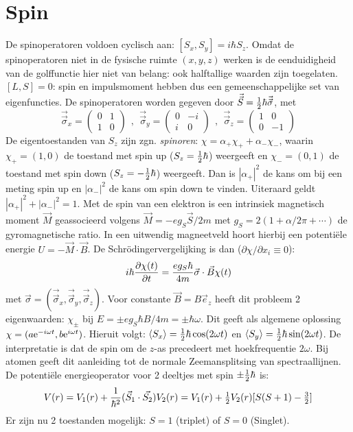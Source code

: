 \section[~~Spin]{Spin}
De spinoperatoren voldoen cyclisch aan: $[S_x,S_y]=i\hbar S_z$. Omdat de
spinoperatoren niet in de fysische ruimte $(x,y,z)$ werken is de
eenduidigheid van de golffunctie hier niet van belang: ook halftallige
waarden zijn toegelaten. $[L,S]=0$: spin en impulsmoment hebben dus een
gemeenschappelijke set van eigenfuncties. De spinoperatoren worden gegeven
door $\vec{\vec{S}}=\mbox{$\frac{1}{2}$}\hbar\vec{\vec{\sigma}}$, met
\[
\vec{\vec{\sigma}}_x=\left(\begin{array}{cc}0&1\\1&0\end{array}\right)~~,~~
\vec{\vec{\sigma}}_y=\left(\begin{array}{cc}0&-i\\i&0\end{array}\right)~~,~~
\vec{\vec{\sigma}}_z=\left(\begin{array}{cc}1&0\\0&-1\end{array}\right)
\]
De eigentoestanden van $S_z$ zijn zgn. {\it spinoren}:
$\chi=\alpha_+\chi_++\alpha_-\chi_-$, waarin $\chi_+=(1,0)$ de toestand met
spin up ($S_z=\mbox{$\frac{1}{2}$}\hbar$) weergeeft en $\chi_-=(0,1)$ de toestand met spin
down ($S_z=-\mbox{$\frac{1}{2}$}\hbar$) weergeeft. Dan is $|\alpha_+|^2$ de kans om bij een
meting spin up en $|\alpha_-|^2$ de kans om spin down te vinden. Uiteraard
geldt $|\alpha_+|^2+|\alpha_-|^2=1$.
\npar
Met de spin van een elektron is een intrinsiek magnetisch moment $\vec{M}$
geassocieerd volgens $\vec{M}=-eg_S\vec{S}/2m$ met $g_S=2(1+\alpha/2\pi+\cdots)$
de gyromagnetische ratio. In een uitwendig magneetveld hoort hierbij een
potenti\"ele energie $U=-\vec{M}\cdot\vec{B}$. De Schr\"odingervergelijking
is dan ($\partial\chi/\partial x_i\equiv0$):
\[
i\hbar\frac{\partial \chi(t)}{\partial t}=\frac{eg_S\hbar}{4m}\vec{\sigma}\cdot\vec{B}\chi(t)
\]
met $\vec{\sigma}=(\vec{\vec{\sigma}}_x,\vec{\vec{\sigma}}_y,\vec{\vec{\sigma}}_z)$.
Voor constante $\vec{B}=B\vec{e}_z$ heeft dit probleem 2 eigenwaarden:
$\chi_\pm$ bij $E=\pm eg_S\hbar B/4m=\pm\hbar\omega$. Dit geeft als algemene
oplossing $\chi=(a{\rm e}^{-i\omega t},b{\rm e}^{i\omega t})$. Hieruit volgt:
$\left\langle S_x \right\rangle=\mbox{$\frac{1}{2}$}\hbar\cos(2\omega t)$ en $\left\langle S_y \right\rangle=\mbox{$\frac{1}{2}$}\hbar\sin(2\omega t)$.
De interpretatie is dat de spin om de $z$-as precedeert met hoekfrequentie
$2\omega$. Bij atomen geeft dit aanleiding tot de normale Zeemansplitsing van
spectraallijnen.
\npar
De potenti\"ele energieoperator voor 2 deeltjes met spin $\pm\mbox{$\frac{1}{2}$}\hbar$ is:
\[
V(r)=V_1(r)+\frac{1}{\hbar^2}(\vec{S}_1\cdot\vec{S_2})V_2(r)=
V_1(r)+\mbox{$\frac{1}{2}$} V_2(r)[S(S+1)-\mbox{$\frac{3}{2}$}]
\]
Er zijn nu 2 toestanden mogelijk: $S=1$ (triplet) of $S=0$ (Singlet).

